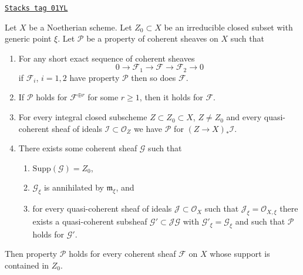 \begin{lemma}
\label{coherent-lemma-property-irreducible-higher-rank-cohomological}
\href{https://stacks.math.columbia.edu/tag/01YL}{\texttt{Stacks tag 01YL}}

Let $X$ be a Noetherian scheme. Let $Z_0 \subset X$ be an irreducible
closed subset with generic point $\xi$. Let $\mathcal{P}$ be a property
of coherent sheaves on $X$ such that
\begin{enumerate}
\item For any short exact sequence of coherent sheaves
$$
0 \to \mathcal{F}_1 \to \mathcal{F} \to \mathcal{F}_2 \to 0
$$
if $\mathcal{F}_i$, $i = 1, 2$ have property $\mathcal{P}$
then so does $\mathcal{F}$.
\item If $\mathcal{P}$ holds for $\mathcal{F}^{\oplus r}$ for
some $r \geq 1$, then it holds for $\mathcal{F}$.
\item For every integral closed subscheme $Z \subset Z_0 \subset X$,
$Z \not = Z_0$ and every quasi-coherent sheaf of ideals
$\mathcal{I} \subset \mathcal{O}_Z$ we have
$\mathcal{P}$ for $(Z \to X)_*\mathcal{I}$.
\item There exists some coherent sheaf $\mathcal{G}$ such that
\begin{enumerate}
\item $\text{Supp}(\mathcal{G}) = Z_0$,
\item $\mathcal{G}_\xi$ is annihilated by $\mathfrak m_\xi$, and
\item for every quasi-coherent sheaf of ideals
$\mathcal{J} \subset \mathcal{O}_X$ such that
$\mathcal{J}_\xi = \mathcal{O}_{X, \xi}$ there exists a quasi-coherent
subsheaf $\mathcal{G}' \subset \mathcal{J}\mathcal{G}$ with
$\mathcal{G}'_\xi = \mathcal{G}_\xi$ and such that
$\mathcal{P}$ holds for $\mathcal{G}'$.
\end{enumerate}
\end{enumerate}
Then property $\mathcal{P}$ holds for every coherent sheaf
$\mathcal{F}$ on $X$ whose support is contained in $Z_0$.
\end{lemma}

